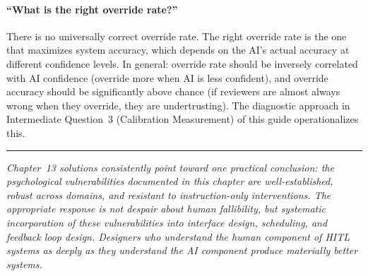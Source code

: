 \paragraph{``What is the right override rate?''}
There is no universally correct override rate. The right override rate is the one that maximizes system accuracy, which depends on the AI's actual accuracy at different confidence levels. In general: override rate should be inversely correlated with AI confidence (override more when AI is less confident), and override accuracy should be significantly above chance (if reviewers are almost always wrong when they override, they are undertrusting). The diagnostic approach in Intermediate Question~3 (Calibration Measurement) of this guide operationalizes this.

\bigskip
\begin{center}
\rule{0.5\textwidth}{0.4pt}
\end{center}
\bigskip

\noindent\textit{Chapter~13 solutions consistently point toward one practical conclusion: the psychological vulnerabilities documented in this chapter are well-established, robust across domains, and resistant to instruction-only interventions. The appropriate response is not despair about human fallibility, but systematic incorporation of these vulnerabilities into interface design, scheduling, and feedback loop design. Designers who understand the human component of HITL systems as deeply as they understand the AI component produce materially better systems.}
